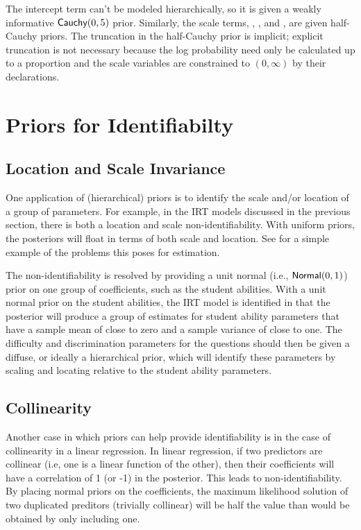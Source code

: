 The intercept term  can't be modeled hierarchically, so it
is given a weakly informative $\mbox{\sf Cauchy}(0,5)$ prior.
Similarly, the scale terms, , ,
and , are given half-Cauchy priors.  The truncation
in the half-Cauchy prior is implicit; explicit truncation is not
necessary because the log probability need only be calculated up to a
proportion and the scale variables are constrained to $(0,\infty)$ by 
their declarations.

\section{Priors for Identifiabilty}\label{priors-for-identification.section}

\subsection{Location and Scale Invariance}

One application of (hierarchical) priors is to identify the scale
and/or location of a group of parameters. For example, in the IRT
models discussed in the previous section, there is both a location and
scale non-identifiability.  With uniform priors, the posteriors will
float in terms of both scale and location.  See
 for a simple example of the problems this
poses for estimation.

The non-identifiability is resolved by providing a unit normal (i.e.,
$\mbox{\sf Normal}(0,1)$) prior on one group of coefficients, such as
the student abilities.  With a unit normal prior on the student
abilities, the IRT model is identified in that the posterior will
produce a group of estimates for student ability parameters that have
a sample mean of close to zero and a sample variance of close to one.
The difficulty and discrimination parameters for the questions should
then be given a diffuse, or ideally a hierarchical prior, which will
identify these parameters by scaling and locating relative to the
student ability parameters.

\subsection{Collinearity}

Another case in which priors can help provide identifiability is in
the case of collinearity in a linear regression.  In linear
regression, if two predictors are collinear (i.e, one is a linear
function of the other), then their coefficients will have a
correlation of 1 (or -1) in the posterior.  This leads to
non-identifiability.  By placing normal priors on the coefficients,
the maximum likelihood solution of two duplicated preditors (trivially
collinear) will be half the value than would be obtained by only
including one.

